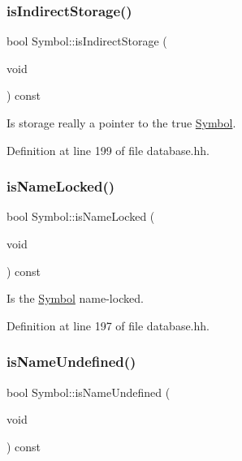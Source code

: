 \subsubsection{\texorpdfstring{isIndirectStorage()}{isIndirectStorage()}}
{\footnotesize\ttfamily bool Symbol\+::is\+Indirect\+Storage (\begin{DoxyParamCaption}\item[{void}]{ }\end{DoxyParamCaption}) const\hspace{0.3cm}{\ttfamily [inline]}}



Is storage really a pointer to the true \mbox{\hyperlink{class_symbol}{Symbol}}. 



Definition at line 199 of file database.\+hh.

\mbox{\label{class_symbol_a22d63f55585c64549bde68ecf1c9153f}} 
\subsubsection{\texorpdfstring{isNameLocked()}{isNameLocked()}}
{\footnotesize\ttfamily bool Symbol\+::is\+Name\+Locked (\begin{DoxyParamCaption}\item[{void}]{ }\end{DoxyParamCaption}) const\hspace{0.3cm}{\ttfamily [inline]}}



Is the \mbox{\hyperlink{class_symbol}{Symbol}} name-\/locked. 



Definition at line 197 of file database.\+hh.

\mbox{\label{class_symbol_a9454755130e3ed3980ec3340d1da663e}} 
\subsubsection{\texorpdfstring{isNameUndefined()}{isNameUndefined()}}
{\footnotesize\ttfamily bool Symbol\+::is\+Name\+Undefined (\begin{DoxyParamCaption}\item[{void}]{ }\end{DoxyParamCaption}) const}



